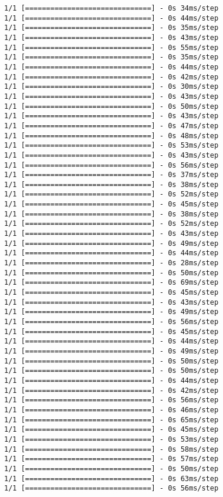 \documentclass[11pt]{article}
\begin{document}
\begin{Verbatim}[commandchars=\\\{\}]
1/1 [==============================] - 0s 34ms/step
1/1 [==============================] - 0s 44ms/step
1/1 [==============================] - 0s 35ms/step
1/1 [==============================] - 0s 43ms/step
1/1 [==============================] - 0s 55ms/step
1/1 [==============================] - 0s 35ms/step
1/1 [==============================] - 0s 44ms/step
1/1 [==============================] - 0s 42ms/step
1/1 [==============================] - 0s 30ms/step
1/1 [==============================] - 0s 43ms/step
1/1 [==============================] - 0s 50ms/step
1/1 [==============================] - 0s 43ms/step
1/1 [==============================] - 0s 47ms/step
1/1 [==============================] - 0s 48ms/step
1/1 [==============================] - 0s 53ms/step
1/1 [==============================] - 0s 43ms/step
1/1 [==============================] - 0s 56ms/step
1/1 [==============================] - 0s 37ms/step
1/1 [==============================] - 0s 38ms/step
1/1 [==============================] - 0s 52ms/step
1/1 [==============================] - 0s 45ms/step
1/1 [==============================] - 0s 38ms/step
1/1 [==============================] - 0s 52ms/step
1/1 [==============================] - 0s 43ms/step
1/1 [==============================] - 0s 49ms/step
1/1 [==============================] - 0s 44ms/step
1/1 [==============================] - 0s 28ms/step
1/1 [==============================] - 0s 50ms/step
1/1 [==============================] - 0s 69ms/step
1/1 [==============================] - 0s 45ms/step
1/1 [==============================] - 0s 43ms/step
1/1 [==============================] - 0s 49ms/step
1/1 [==============================] - 0s 56ms/step
1/1 [==============================] - 0s 45ms/step
1/1 [==============================] - 0s 44ms/step
1/1 [==============================] - 0s 49ms/step
1/1 [==============================] - 0s 50ms/step
1/1 [==============================] - 0s 50ms/step
1/1 [==============================] - 0s 44ms/step
1/1 [==============================] - 0s 42ms/step
1/1 [==============================] - 0s 56ms/step
1/1 [==============================] - 0s 46ms/step
1/1 [==============================] - 0s 65ms/step
1/1 [==============================] - 0s 45ms/step
1/1 [==============================] - 0s 53ms/step
1/1 [==============================] - 0s 58ms/step
1/1 [==============================] - 0s 57ms/step
1/1 [==============================] - 0s 50ms/step
1/1 [==============================] - 0s 63ms/step
1/1 [==============================] - 0s 56ms/step

\end{Verbatim}
\end{document}
